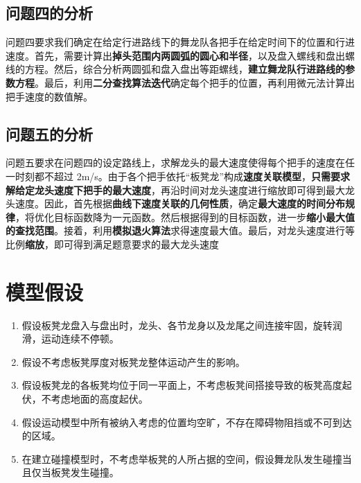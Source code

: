 \documentclass[a4paper]{article}
\begin{document}
	\subsection{问题四的分析}
		问题四要求我们确定在给定行进路线下的舞龙队各把手在给定时间下的位置和行进速度。首先，需要计算出\textbf{掉头范围内两圆弧的圆心和半径}，以及盘入螺线和盘出螺线的方程。然后，综合分析两圆弧和盘入盘出等距螺线，\textbf{建立舞龙队行进路线的参数方程}。最后，利用\textbf{二分查找算法迭代}确定每个把手的位置，再利用微元法计算出把手速度的数值解。
	\subsection{问题五的分析}
		问题五要求在问题四的设定路线上，求解龙头的最大速度使得每个把手的速度在任一时刻都不超过 2m/s。由于各个把手依托“板凳龙”构成\textbf{速度关联模型}，\textbf{只需要求解给定龙头速度下把手的最大速度}，再沿时间对龙头速度进行缩放即可得到最大龙头速度。因此，首先根据\textbf{曲线下速度关联的几何性质}，确定\textbf{最大速度的时间分布规律}，将优化目标函数降为一元函数。然后根据得到的目标函数，进一步\textbf{缩小最大值的查找范围}。接着，利用\textbf{模拟退火算法}求得速度最大值。最后，对龙头速度进行等比例\textbf{缩放}，即可得到满足题意要求的最大龙头速度

	\section{模型假设}
	\begin{enumerate}
		\item 假设板凳龙盘入与盘出时，龙头、各节龙身以及龙尾之间连接牢固，旋转润滑，运动连续不停顿。
		\item 假设不考虑板凳厚度对板凳龙整体运动产生的影响。
		\item 假设板凳龙的各板凳均位于同一平面上，不考虑板凳间搭接导致的板凳高度起伏，不考虑地面的高度起伏。
        \item 假设运动模型中所有被纳入考虑的位置均空旷，不存在障碍物阻挡或不可到达的区域。
        \item 在建立碰撞模型时，不考虑举板凳的人所占据的空间，假设舞龙队发生碰撞当且仅当板凳发生碰撞。
	\end{enumerate}

\end{document}
